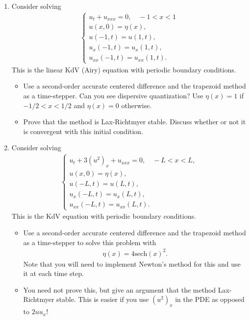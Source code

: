 \documentclass[10pt]{amsart}
\begin{document}
\mline
\begin{enumerate}[label={\bf Problem~{\arabic*}:}]
\item  Consider solving
  \begin{align*}
    \begin{cases} u_t + u_{xxx} = 0, \quad -1 < x < 1\\
      u(x,0) = \eta(x),\\
      u(-1,t) = u(1,t),\\
      u_x(-1,t) = u_x(1,t),\\
      u_{xx}(-1,t) = u_{xx}(1,t).\end{cases}
    \end{align*}
    This is the linear KdV (Airy) equation with periodic boundary conditions.
    \begin{itemize}
    \item Use a second-order accurate centered difference and the trapezoid method as a time-stepper. Can you see dispersive quantization? Use $\eta(x) = 1$ if $-1/2 < x < 1/2$ and $\eta(x) =0$ otherwise.
    \item Prove that the method is Lax-Richtmyer stable.  Discuss whether or not it is convergent with this initial condition.
    \end{itemize}

    \mline

  \item Consider solving
  \begin{align*}
    \begin{cases} u_t + 3 (u^2)_x + u_{xxx} = 0, \quad -L < x < L,\\
      u(x,0) = \eta(x),\\
      u(-L,t) = u(L,t),\\
      u_x(-L,t) = u_x(L,t),\\
      u_{xx}(-L,t) = u_{xx}(L,t).\end{cases}
    \end{align*}
    This is the KdV equation with periodic boundary conditions.
    \begin{itemize}
    \item Use a second-order accurate centered difference and the trapezoid method as a time-stepper to solve this problem with
      \begin{align*}
        \eta(x) = 4 \mathrm{sech}(x)^2.
      \end{align*}
      Note that you will need to implement Newton's method for this and use it at each time step.
    \item You need not prove this, but give an argument that the method Lax-Richtmyer stable.  This is easier if you use $(u^2)_x$ in the PDE as opposed to $2 u u_x$!
    \end{itemize}


\end{enumerate}
\end{document}
